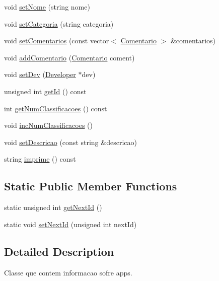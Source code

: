 \begin{DoxyCompactItemize}
\item 
void \hyperlink{class_app_a779936463595bd7babe3fabdd3b81530}{set\+Nome} (string nome)
\item 
void \hyperlink{class_app_add85e6926cb052edac84f210889df476}{set\+Categoria} (string categoria)
\item 
void \hyperlink{class_app_a40d8afcc9663054f4f5445a37dfd542d}{set\+Comentarios} (const vector$<$ \hyperlink{class_comentario}{Comentario} $>$ \&comentarios)
\item 
void \hyperlink{class_app_a4291a68b048c4976186ac2dc58062873}{add\+Comentario} (\hyperlink{class_comentario}{Comentario} coment)
\item 
void \hyperlink{class_app_aa2d4de1233b4a07def3cdae0d165d4cf}{set\+Dev} (\hyperlink{class_developer}{Developer} $\ast$dev)
\item 
unsigned int \hyperlink{class_app_a17d1e4e52f2357b25437d21d21728bcb}{get\+Id} () const 
\item 
int \hyperlink{class_app_afca72f5119a5fbb1c7972d8085abc2c7}{get\+Num\+Classificacoes} () const 
\item 
void \hyperlink{class_app_ada474e2840fd5ca144dc6d5d61c55460}{inc\+Num\+Classificacoes} ()
\item 
void \hyperlink{class_app_af0140ea32801ddf481e61fda65024ba8}{set\+Descricao} (const string \&descricao)
\item 
string \hyperlink{class_app_af3a98845da9ba10769df22e1e21f3db0}{imprime} () const 
\end{DoxyCompactItemize}
\subsection*{Static Public Member Functions}
\begin{DoxyCompactItemize}
\item 
static unsigned int \hyperlink{class_app_aa1d00d182fcaf9fb8c85a0c0306a542d}{get\+Next\+Id} ()
\item 
static void \hyperlink{class_app_ac02dab3cd7642d98173bfd6365eb6d9e}{set\+Next\+Id} (unsigned int next\+Id)
\end{DoxyCompactItemize}


\subsection{Detailed Description}
Classe que contem informacao sofre apps. 

